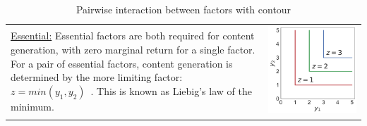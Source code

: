 \begin{table}[h!]
  \vspace{-0.5\baselineskip}
  \caption{Pairwise interaction between factors with contour}
  \vspace{-\baselineskip}
  \label{tab:interaction}
  \centering
  \begin{tabular}{m{}c}
	\vspace{-5pt}
    \uline{Essential:} Essential factors are both required for content generation, with zero marginal return for a single factor. For a pair of essential factors, content generation is determined by the more limiting factor: $z = min(y_1, y_2)$~\cite{tilman1980}. This is known as Liebig's law of the minimum.
    &
    \begin{minipage}{.17\textwidth}
      \includegraphics[width=\textwidth, height=\textwidth]{Figures/Essential.pdf}
    \end{minipage}
    \\ 

\end{tabular}
\end{table}
